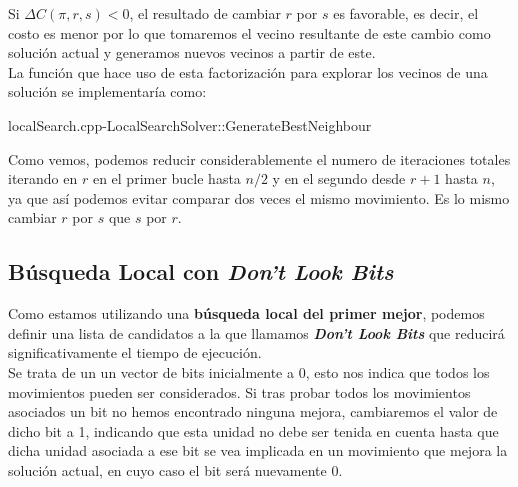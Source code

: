 \documentclass[a4paper, 12pt]{article}
\begin{document}
      \newpage
      Si $\Delta C(\pi,r,s) < 0$, el resultado de cambiar $r$ por $s$ es favorable, es decir, el costo es menor por lo que tomaremos el vecino resultante de este cambio como solución actual y generamos nuevos vecinos a partir de este.\\
      
      La función que hace uso de esta factorización para explorar los vecinos de una solución se implementaría como:
      \begin{algorithm}
      	\caption*{localSearch.cpp-LocalSearchSolver::GenerateBestNeighbour}
      \end{algorithm}
      
      Como vemos, podemos reducir considerablemente el numero de iteraciones totales iterando en $r$ en el primer bucle hasta $n/2$ y en el segundo desde $r+1$ hasta $n$, ya que así podemos evitar comparar dos veces el mismo movimiento. Es lo mismo cambiar $r$ por $s$ que $s$ por $r$.
     
      
      \newpage
      \subsection{Búsqueda Local con \textit{Don't Look Bits}}
      Como estamos utilizando una \textbf{búsqueda local del primer mejor}, podemos definir una lista de candidatos a la que llamamos \textbf{\textit{Don't Look Bits}} que reducirá significativamente el tiempo de ejecución.\\
      
      Se trata de un un vector de bits inicialmente a 0, esto nos indica que todos los movimientos pueden ser considerados. Si tras probar todos los movimientos asociados un bit no hemos encontrado ninguna mejora, cambiaremos el valor de dicho bit a 1, indicando que esta unidad no debe ser tenida en cuenta hasta que dicha unidad asociada a ese bit se vea implicada en un movimiento que mejora la solución actual, en cuyo caso el bit será nuevamente 0.\\
      
\end{document}

